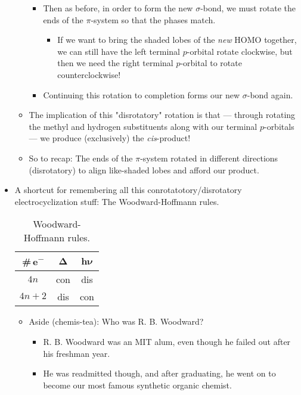 \documentclass[../notes.tex]{subfiles}
\begin{document}
\begin{itemize}
\begin{itemize}
\begin{itemize}
\begin{itemize}
            \end{itemize}
            \item Then as before, in order to form the new $\sigma$-bond, we must rotate the ends of the $\pi$-system so that the phases match.
            \begin{itemize}
                \item If we want to bring the shaded lobes of the \emph{new} HOMO together, we can still have the left terminal $p$-orbital rotate clockwise, but then we need the right terminal $p$-orbital to rotate counterclockwise!
            \end{itemize}
            \item Continuing this rotation to completion forms our new $\sigma$-bond again.
        \end{itemize}
        \item The implication of this "disrotatory" rotation is that --- through rotating the methyl and hydrogen substituents along with our terminal $p$-orbitals --- we produce (exclusively) the \emph{cis}-product!
        \item So to recap: The ends of the $\pi$-system rotated in different directions (disrotatory) to align like-shaded lobes and afford our product.
    \end{itemize}
    \item A shortcut for remembering all this conrotatotory/disrotatory electrocyclization stuff: The Woodward-Hoffmann rules.
    \begin{table}[h!]
        \centering
        \small
        \renewcommand{\arraystretch}{1.2}
        \begin{tabular}{c|c|c}
            \textbf{\#\,e\textsuperscript{$\bm{-}$}} & $\bm{\Delta}$ & $\bm{h\nu}$\\
            \hline
            $4n$ & con & dis\\
            $4n+2$ & dis & con\\
        \end{tabular}
        \caption{Woodward-Hoffmann rules.}
        \label{tab:WHrules}
    \end{table}
    \begin{itemize}
        \item Aside (chemis-tea): Who was R. B. Woodward?
        \begin{itemize}
            \item R. B. Woodward was an MIT alum, even though he failed out after his freshman year.
            \item He was readmitted though, and after graduating, he went on to become our most famous synthetic organic chemist.

\end{itemize}
\end{itemize}
\end{itemize}
\end{document}
